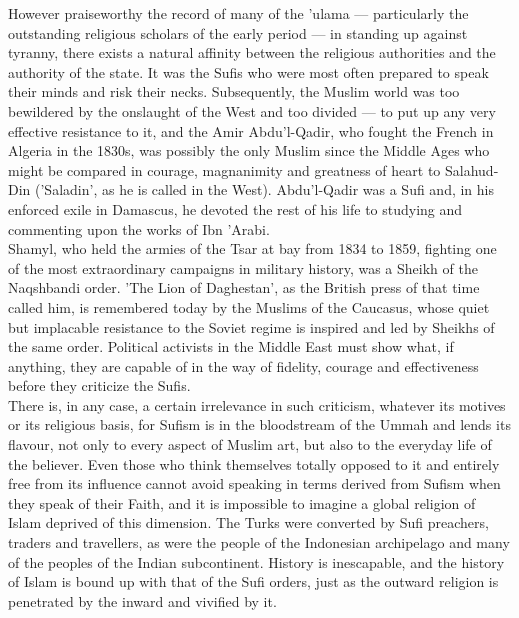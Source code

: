 \documentclass[10pt, twoside,openright]{book}
\begin{document}
However praiseworthy the record of many of the 'ulama --- particularly the outstanding religious 
scholars of the early period --- in standing up against tyranny, there exists a natural affinity 
between the religious authorities and the authority of the state. It was the Sufis who were most 
often prepared to speak their minds and risk their necks. Subsequently, the Muslim world was too 
bewildered by the onslaught of the West and too divided --- to put up any very effective resistance to 
it, and the Amir Abdu'l\hyp{}Qadir, who fought the French in Algeria in the 1830s, was possibly the only 
Muslim since the Middle Ages who might be compared in courage, magnanimity and greatness of heart to 
Salahud\hyp{}Din ('Saladin', as he is called in the West). Abdu'l-Qadir was a Sufi and, in his enforced 
exile in Damascus, he devoted the rest of his life to studying and commenting upon the works of Ibn 
'Arabi. \\

Shamyl, who held the armies of the Tsar at bay from 1834 to 1859, fighting one of the most 
extraordinary campaigns in military history, was a Sheikh of the Naqshbandi order. 'The Lion of 
Daghestan', as the British press of that time called him, is remembered today by the Muslims of the 
Caucasus, whose quiet but implacable resistance to the Soviet regime is inspired and led by Sheikhs 
of the same order. Political activists in the Middle East must show what, if anything, they are 
capable of in the way of fidelity, courage and effectiveness before they criticize the Sufis. \\

There is, in any case, a certain irrelevance in such criticism, whatever its motives or its religious 
basis, for Sufism is in the bloodstream of the Ummah and lends its flavour, not only to every aspect 
of Muslim art, but also to the everyday life of the believer. Even those who think themselves totally 
opposed to it and entirely free from its influence cannot avoid speaking in terms derived from Sufism 
when they speak of their Faith, and it is impossible to imagine a global religion of Islam deprived 
of this dimension. The Turks were converted by Sufi preachers, traders and travellers, as were the 
people of the Indonesian archipelago and many of the peoples of the Indian subcontinent. History is 
inescapable, and the history of Islam is bound up with that of the Sufi orders, just as the outward 
religion is penetrated by the inward and vivified by it. \\
\end{document}
